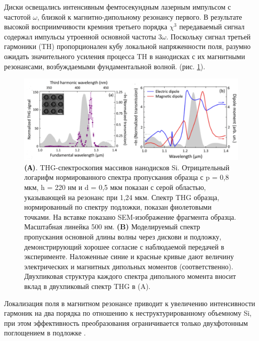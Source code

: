 Диски освещались интенсивным фемтосекундным лазерным импульсом с частотой $\omega$, близкой к магнитно-дипольному резонансу первого. В результате высокой восприимчивости кремния третьего порядка $\chi^3$ передаваемый сигнал содержал импульсы утроенной основной частоты $3\omega$. Поскольку сигнал третьей гармоники (TH) пропорционален кубу локальной напряженности поля, разумно ожидать значительного усиления процесса TH в нанодисках с их магнитными резонансами, возбуждаемыми фундаментальной волной. (рис. \ref{nonliner:nanodisks}). 
\begin{figure}[h!]
    \centering
	\includegraphics[width=0.8\linewidth]{images/fig3.png}
	\caption{\textbf{(А)}. THG-спектроскопия массивов нанодисков Si. Отрицательный логарифм нормированного спектра пропускания образца с p = 0,8 мкм, h = 220 нм и d = 0,5 мкм показан с серой областью, указывающей на резонанс при 1,24 мкм. Спектр THG образца, нормированный по спектру подложки, показан фиолетовыми точками. На вставке показано SEM-изображение фрагмента образца. Масштабная линейка  500 нм. \textbf{(B)} Моделируемый спектр пропускания основной длины волны через дискови и подложку, демонстрирующий хорошее согласие с наблюдаемой передачей в эксперименте. Наложенные синие и красные кривые дают величину электрических и магнитных дипольных моментов (соответственно). Двухпиковая структура каждого спектра дипольного момента вносит вклад в двухпиковый спектр THG в (A).}
	\label{nonliner:nanodisks}
\end{figure}
\hspace*{2mm}
Локализация поля в магнитном резонансе приводит к увеличению интенсивности гармоник на два порядка по отношению к неструктурированному объемному Si, при этом эффективность преобразования ограничивается только двухфотонным поглощением в подложке \cite{shcherbakov2014enhanced}. 


